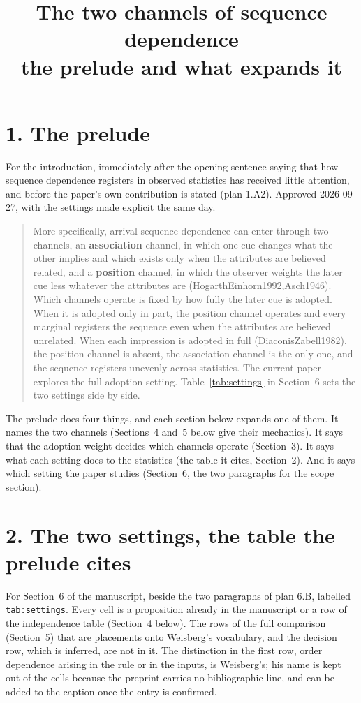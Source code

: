 \documentclass[11pt,a4paper]{article}
\title{The two channels of sequence dependence\\ \large the prelude and what expands it}
\author{}
\date{}
\providecommand{\citep}[1]{(#1)}
\begin{document}
\maketitle
\renewcommand{\arraystretch}{1.3}

\section*{1. The prelude}

\noindent For the introduction, immediately after the opening sentence saying
that how sequence dependence registers in observed statistics has received
little attention, and before the paper's own contribution is stated (plan
1.A2). Approved 2026-09-27, with the settings made explicit the same day.

\begin{quote}
More specifically, arrival-sequence dependence can enter through two
channels, an \textbf{association} channel, in which one cue changes what the
other implies and which exists only when the attributes are believed related,
and a \textbf{position} channel, in which the observer weights the later cue
less whatever the attributes are \citep{HogarthEinhorn1992,Asch1946}. Which
channels operate is fixed by how fully the later cue is adopted. When it is
adopted only in part, the position channel operates and every marginal
registers the sequence even when the attributes are believed unrelated. When
each impression is adopted in full \citep{DiaconisZabell1982}, the position
channel is absent, the association channel is the only one, and the sequence
registers unevenly across statistics. The current paper explores the
full-adoption setting. Table~\ref{tab:settings} in Section~6 sets the two
settings side by side.
\end{quote}

\noindent The prelude does four things, and each section below expands one
of them. It names the two channels (Sections~4 and~5 below give their
mechanics). It says that the adoption weight decides which channels operate
(Section~3). It says what each setting does to the statistics (the table it
cites, Section~2). And it says which setting the paper studies (Section~6,
the two paragraphs for the scope section).

\section*{2. The two settings, the table the prelude cites}

\noindent For Section~6 of the manuscript, beside the two paragraphs of
plan 6.B, labelled \texttt{tab:settings}. Every cell is a proposition already
in the manuscript or a row of the independence table (Section~4 below). The
rows of the full comparison (Section~5) that are placements onto Weisberg's
vocabulary, and the decision row, which is inferred, are not in it. The
distinction in the first row, order dependence arising in the rule or in the
inputs, is Weisberg's; his name is kept out of the cells because the preprint
carries no bibliographic line, and can be added to the caption once the entry
is confirmed.
\end{document}

